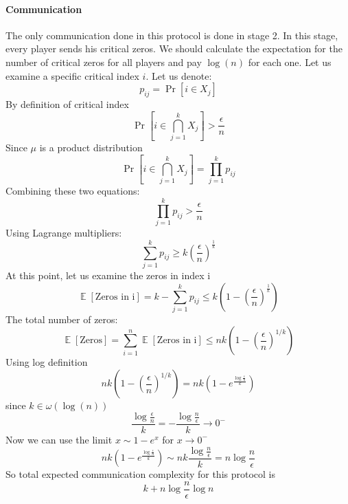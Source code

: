 \documentclass{article}
\theoremstyle{plain}
\begin{document}
\paragraph{Communication}
The only communication done in this protocol is done in stage 2. 
In this stage, every player sends his critical zeros. 
We should calculate the expectation for the number of critical zeros for all players and pay $\log(n)$ for each one. \newline
Let us examine a specific critical index $i$. \newline
Let us denote:
\begin{equation*}
    p_{ij} = \Pr[i \in X_j]
\end{equation*}
By definition of critical index
\begin{equation*} 
    \Pr[i \in \bigcap^{k}_{j=1}{X_j}] > \frac{\epsilon}{n}
\end{equation*}
Since $\mu$ is a product distribution
\begin{equation*} 
    \Pr[i \in \bigcap^{k}_{j=1}{X_j}] = \prod_{j=1}^{k}p_{ij}
\end{equation*}
Combining these two equations:
\begin{equation*} 
    \prod_{j=1}^{k}p_{ij} > \frac{\epsilon}{n}
\end{equation*}
Using Lagrange multipliers:
\begin{equation*}
    \sum_{j=1}^{k}p_{ij} \geq k \left(\frac{\epsilon}{n} \right)^{\frac{1}{k}}
\end{equation*}
At this point, let us examine the zeros in index i
\begin{equation*}
    \mathop{\mathbb{E}}[\text{Zeros in i}] = k - \sum_{j=1}^{k}p_{ij} \leq k \left(1 - \left(\frac{\epsilon}{n}\right)^{\frac{1}{k}}\right)
\end{equation*}
The total number of zeros:
\begin{equation*}
    \mathop{\mathbb{E}}[\text{Zeros}] = \sum_{i=1}^n\mathop{\mathbb{E}}[\text{Zeros in i}] \leq nk\left(1-\left(\frac{\epsilon}{n}\right)^{1/k}\right)
\end{equation*}
Using log definition
\begin{equation*}
    nk\left(1-\left(\frac{\epsilon}{n}\right)^{1/k}\right) = nk\left(1-e^{\frac{\log{\frac{\epsilon}{n}}}{k}}\right)
\end{equation*}
since $k \in \omega(\log(n))$
\begin{equation*}
    \frac{\log{\frac{\epsilon}{n}}}{k} = -\frac{\log{\frac{n}{\epsilon}}}{k} \rightarrow 0^{-}
\end{equation*}
Now we can use the limit $x \sim 1-e^x$ for $x \rightarrow 0^{-}$ 
\begin{equation*}
      nk\left(1-e^{\frac{\log{\frac{\epsilon}{n}}}{k}}\right) \sim nk\frac{\log{\frac{n}{\epsilon}}}{k} = n\log{\frac{n}{\epsilon}}
\end{equation*}
So total expected communication complexity for this protocol is
\begin{equation*}
    k + n\log{\frac{n}{\epsilon}}\log n
\end{equation*}
\end{document}
